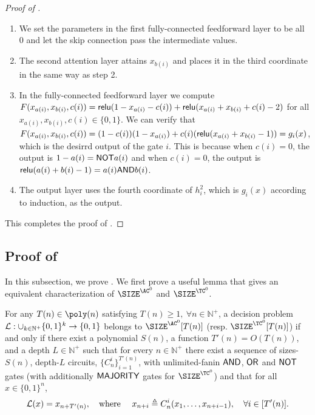 \begin{proof}[Proof of ]
\begin{enumerate}
		 
		
		\item We set the parameters in the first fully-connected feedforward layer to be all $0$ and let the skip connection pass the intermediate values.
		\item The second attention layer attains $x_{b(i)}$ and places it in the third coordinate in the same way as step 2. 
		\item In the fully-connected feedforward layer we compute $F(x_{a(i)}, x_{b(i)}, c(i)) = \mathsf{relu}(1 - x_{a(i)}-c(i)) + \mathsf{relu}(x_{a(i)} + x_{b(i)} + c(i)-2)$ for all $x_{a(i)},x_{b(i)},c(i)\in\{0,1\}$. We can verify that $F(x_{a(i)}, x_{b(i)}, c(i))= (1-c(i))(1-x_{a(i)}) + c(i)(\mathsf{relu}(x_{a(i)} + x_{b(i)}-1)) = g_i(x)$,  which is the desirrd output of the gate $i$. This is because when $c(i)=0$, the output is $1-a(i)=\mathsf{NOT} a(i)$ and when $c(i)=0$, the output is $\mathsf{relu}(a(i)+b(i)-1) = a(i) \mathsf{AND} b(i)$.  
		\item The output layer uses the fourth coordinate of $h^2_i$, which is $g_i(x)$ according to induction, as the output. 
	\end{enumerate}
This completes the proof of .
\end{proof}


\subsection{Proof of }\label{appsec:proof_cot_dpolyn_slogn_main}

In this subsection, we prove . We first prove a useful lemma that gives an equivalent characterization of $\SIZE^{\AC^0}$ and $\SIZE^{\TC^0}$.

\begin{lemma}\label{lem:size_Tn_with_TC0_oracle}
	For any $T(n)\in \poly(n)$ satisfying $T(n)\ge 1,\ \forall n\in\mathbb{N}^+$, a  decision problem ${\mathcal{L}}:\cup_{k\in \mathbb{N}^+}\{0,1\}^k\to \{0,1\}$ belongs to $\SIZE^{\AC^0}[T(n)]$ (resp. $\SIZE^{\TC^0}[T(n)]$)  if and only if  there exist a polynomial $S(n)$, a function $T'(n)=O(T(n))$, and a depth $L\in\mathbb{N}^+$  such that for every $n\in\mathbb{N}^+$ there exist a sequence of sizes-$S(n)$, depth-$L$ circuits, $\{C_n^{i}\}_{i=1}^{T'(n)}$, with unlimited-fanin $\mathsf{AND}$, $\mathsf{OR}$ and $\mathsf{NOT}$ gates (with additionally $\mathsf{MAJORITY}$ gates for $\SIZE^{\TC^0}$) and that for all $ x\in\{0,1\}^n$,
	\begin{align}
		{\mathcal{L}}(x) = x_{n+T'(n)}, \text{\quad where \quad }  x_{n+i}\triangleq C_n^i(x_1,\ldots, x_{n+i-1}), \quad \forall i \in [T'(n)].
	\end{align}
\end{lemma}

